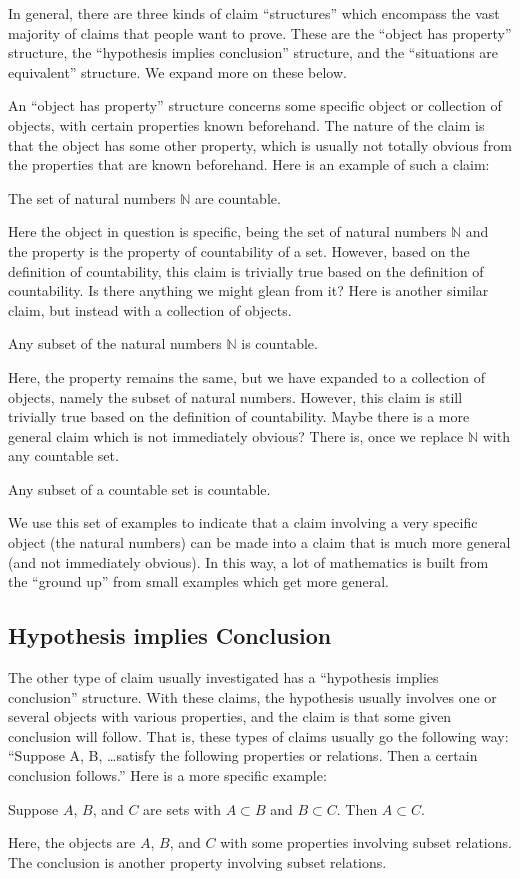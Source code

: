 In general, there are three kinds of claim ``structures'' which encompass the vast majority of claims that people want to prove. These are the ``object has property'' structure, the ``hypothesis implies conclusion'' structure, and the ``situations are equivalent'' structure. We expand more on these below.

An ``object has property'' structure concerns some specific object or collection of objects, with certain properties known beforehand. The nature of the claim is that the object has some other property, which is usually not totally obvious from the properties that are known beforehand. Here is an example of such a claim:
\begin{proposition}
The set of natural numbers $\mathbb{N}$ are countable.
\end{proposition}
Here the object in question is specific, being the set of natural numbers $\mathbb{N}$ and the property is the property of countability of a set. However, based on the definition of countability, this claim is trivially true based on the definition of countability. Is there anything we might glean from it? Here is another similar claim, but instead with a collection of objects.
\begin{proposition}
Any subset of the natural numbers $\mathbb{N}$ is countable.
\end{proposition}
Here, the property remains the same, but we have expanded to a collection of objects, namely the subset of natural numbers. However, this claim is still trivially true based on the definition of countability. Maybe there is a more general claim which is not immediately obvious? There is, once we replace $\mathbb{N}$ with any countable set.
\begin{proposition}
Any subset of a countable set is countable.
\end{proposition}
We use this set of examples to indicate that a claim involving a very specific object (the natural numbers) can be made into a claim that is much more general (and not immediately obvious). In this way, a lot of mathematics is built from the ``ground up'' from small examples which get more general.

\subsection{Hypothesis implies Conclusion}

The other type of claim usually investigated has a ``hypothesis implies conclusion'' structure. With these claims, the hypothesis usually involves one or several objects with various properties, and the claim is that some given conclusion will follow. That is, these types of claims usually go the following way: ``Suppose A, B, \ldots satisfy the following properties or relations. Then a certain conclusion follows.'' Here is a more specific example:

\begin{proposition}
Suppose $A$, $B$, and $C$ are sets with $A \subset B$ and $B \subset C$. Then $A \subset C$.
\end{proposition}

Here, the objects are $A$, $B$, and $C$ with some properties involving subset relations. The conclusion is another property involving subset relations. 